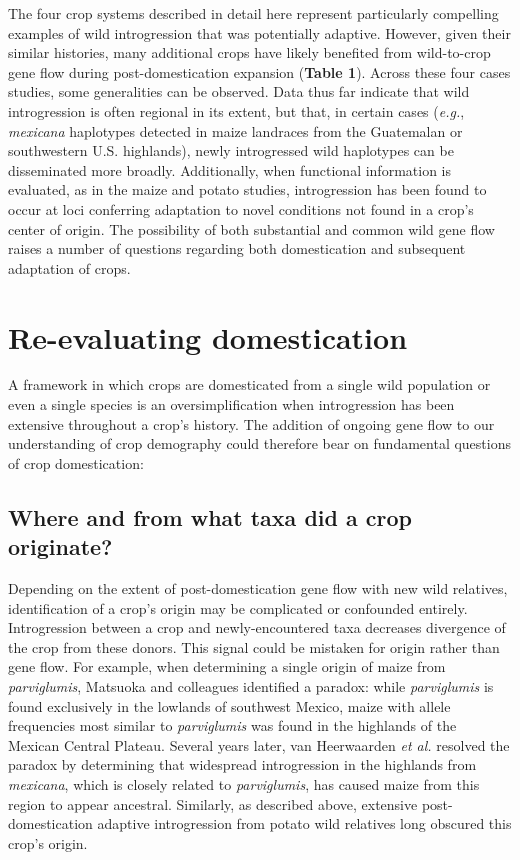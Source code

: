 \documentclass[11pt]{article}
\begin{document}
The four crop systems described in detail here represent particularly compelling examples of wild introgression that was potentially adaptive.
However, given their similar histories, many additional crops have likely benefited from wild-to-crop gene flow during post-domestication expansion (\textbf{Table 1}).
Across these four cases studies, some generalities can be observed.
Data thus far indicate that wild introgression is often regional in its extent, but that, in certain cases (\emph{e.g.}, \emph{mexicana} haplotypes detected in maize landraces from the Guatemalan or southwestern U.S. highlands), newly introgressed wild haplotypes can be disseminated more broadly.
Additionally, when functional information is evaluated, as in the maize and potato studies, introgression has been found to occur at loci conferring adaptation to novel conditions not found in a crop's center of origin.
The possibility of both substantial and common wild gene flow raises a number of questions regarding both domestication and subsequent adaptation of crops.

\section*{Re-evaluating domestication}

A framework in which crops are domesticated from a single wild population or even a single species is an oversimplification when introgression has been extensive throughout a crop's history.
The addition of ongoing gene flow to our understanding of crop demography could therefore bear on fundamental questions of crop domestication:

\subsection*{Where and from what taxa did a crop originate?}
Depending on the extent of post-domestication gene flow with new wild relatives, identification of a crop's origin may be complicated or confounded entirely.
Introgression between a crop and newly-encountered taxa decreases divergence of the crop from these donors.
This signal could be mistaken for origin rather than gene flow.
For example, when determining a single origin of maize from \emph{parviglumis}, Matsuoka and colleagues \cite{matsuoka2002single} identified a paradox: while \emph{parviglumis} is found exclusively in the lowlands of southwest Mexico, maize with allele frequencies most similar to \emph{parviglumis} was found in the highlands of the Mexican Central Plateau.
Several years later, van Heerwaarden \emph{et al.} \cite{vanHeerwaarden2011} resolved the paradox by determining that widespread introgression in the highlands from \emph{mexicana}, which is closely related to \emph{parviglumis}, has caused maize from this region to appear ancestral.
Similarly, as described above, extensive post-domestication adaptive introgression from  potato wild relatives long obscured this crop's origin.
\end{document}
